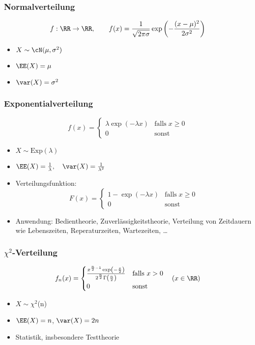 \documentclass{scrreprt}
\begin{document}
\subsubsection{Normalverteilung}
$$f: \RR\to \RR, \qquad f(x)=\frac{1}{\sqrt{2\pi\sigma}}\exp\left(-\frac{(x-\mu)^2}{2\sigma^2}\right)$$

\begin{itemize}
\item $X\sim \cN(\mu, \sigma^2)$
\item $\EE(X)=\mu$
\item $\var(X) = \sigma^2$
\end{itemize}

\subsubsection{Exponentialverteilung}
$$f(x)=\begin{cases}
\lambda \exp(-\lambda x) & \mathrm{falls} \; x\geq 0\\
0 & \mathrm{sonst}
\end{cases}
$$
\begin{itemize}
\item $X\sim \mathrm{Exp}(\lambda)$
\item $\EE(X)=\frac{1}{\lambda}, \quad \var(X)=\frac{1}{\lambda^2}$
\item Verteilungsfunktion:
$$F(x)=\begin{cases}
1-\exp(-\lambda x) & \mathrm{falls}\; x \geq 0\\
0 & \mathrm{sonst}
\end{cases}$$
\item Anwendung: Bedientheorie, Zuverlässigkeitstheorie, Verteilung von Zeitdauern wie Lebenszeiten, Reperaturzeiten, Wartezeiten, …
\end{itemize}

\subsubsection{\texorpdfstring{$ \chi^2 $}{Chi-Quadrat}-Verteilung}

$$f_n(x)=\begin{cases}
\frac{x^{\frac{n}{2}-1}\exp\left(-\frac{x}{2}\right)}{2^{\frac{n}{2}}\Gamma\left(\frac{n}{2}\right)} & \text{falls }x>0\\
0 & \text{sonst}
\end{cases} \quad (x\in \RR)$$

\begin{itemize}
	\item $X\sim \chi^{2}$(n)
	\item $\EE(X)=n$, $\var(X)=2n$
	\item Statistik, insbesondere Testtheorie
\end{itemize}
\end{document}
